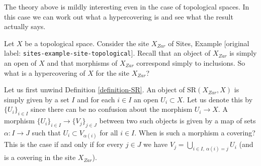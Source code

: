 \documentclass[10pt,a4paper]{article}
\theoremstyle{plain}
\theoremstyle{definition}
\theoremstyle{remark}
\numberwithin{equation}{subsection}
\begin{document}
\noindent
The theory above is mildly interesting even in the case of topological
spaces. In this case we can work out what a hypercovering is and see
what the result actually says.

\medskip\noindent
Let $X$ be a topological space. Consider the site $X_{Zar}$
of Sites, Example \textnormal{[original label: \nolinkurl{sites-example-site-topological}]}. Recall that
an object of $X_{Zar}$ is simply an open of $X$ and that morphisms
of $X_{Zar}$ correspond simply to inclusions. So what is a
hypercovering of $X$ for the site $X_{Zar}$?

\medskip\noindent
Let us first unwind Definition \ref{definition-SR}.
An object of $\text{SR}(X_{Zar}, X)$ is simply given by a set
$I$ and for each $i \in I$ an open $U_i \subset X$.
Let us denote this by $\{U_i\}_{i \in I}$ since there can be no
confusion about the morphism $U_i \to X$.
A morphism $\{U_i\}_{i \in I} \to \{V_j\}_{j \in J}$
between two such objects is given by a map of sets
$\alpha : I \to J$ such that $U_i \subset V_{\alpha(i)}$ for all
$i \in I$. When is such a morphism a covering? This is the case
if and only if for every $j \in J$ we have
$V_j = \bigcup_{i\in I, \ \alpha(i) = j} U_i$ (and is
a covering in the site $X_{Zar}$).
\end{document}
